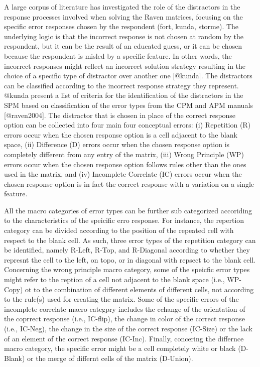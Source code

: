 A large corpus of literature has investigated the role of the distractors in the response processes involved when solving the Raven matrices, focusing on the specific error responses chosen by the respondent (fort, kunda, storme).
The underlying logic is that the incorrect response is not chosen at random by the respondent, but it can be the result of an educated guess, or it can be chosen because the respondent is misled by a specific feature.
In other words, the incorrect responses might reflect an incorrect solution strategy resulting in the choice of a specific type of distractor over another one {[}@kunda{]}.
The distractors can be classified according to the incorrect response strategy they represent.
@kunda present a list of criteria for the identification of the distractors in the SPM based on classification of the error types from the CPM and APM manuals {[}@raven2004{]}.
The distractor that is chosen in place of the correct response option can be collected into four main four conceptual errors: (i) Repetition (R) errors occur when the chosen response option is a cell adjacent to the blank space, (ii) Difference (D) errors occur when the chosen response option is completely different from any entry of the matrix, (iii) Wrong Principle (WP) errors occur when the chosen response option follows rules other than the ones used in the matrix, and (iv) Incomplete Correlate (IC) errors occur when the chosen response option is in fact the correct response with a variation on a single feature.

{
All the macro categories of error types can be further sub categorized accoriding to the characteristics of the speicific erro response. For instance, the repertion category can be divided according to the position of the repeated cell with respect to the blank cell. As such, three error types of the repetition category can be identified, namely R-Left, R-Top, and R-Diagonal according to whether they represnt the cell to the left, on topo, or in diagonal with repsect to the blank cell.
Concerning the wrong principle macro category, some of the speicfic error types might refer to the reption of a cell not adjacent to the blank space (i.e., WP-Copy) ot to the combination of different elements of different cells, not according to the rule(s) used for creating the matrix.
Some of the specific errors of the incomplete correlate macro categpry includes the cchange of the orientation of the coprrect response (i.e., IC-flip), the change in color of the correct response (i.e., IC-Neg), the change in the size of the correct response (IC-Size) or the lack of an element of the correct response (IC-Inc).
Finally, concering the differnce macro category, the specific error might be a cell completely white or black (D-Blank) or the merge of differnt cells of the matrix (D-Union).
}


